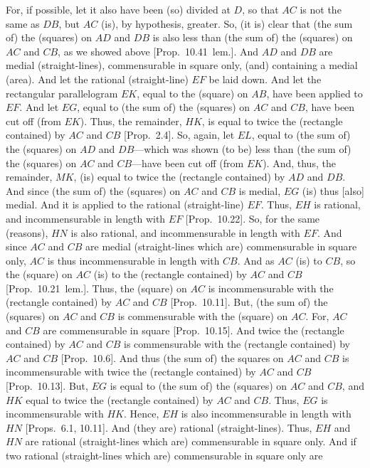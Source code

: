 For, if possible, let it also have  been (so) divided at $D$, so that $AC$ is not the
same as $DB$, but $AC$ (is), by hypothesis, greater. So, (it is)  clear that
(the sum of) the (squares) on $AD$ and $DB$ is also less than (the sum of)
the (squares) on $AC$ and $CB$, as we showed above [Prop.~10.41~lem.].  And $AD$ and $DB$ are medial (straight-lines), commensurable in square only, (and)
containing a medial (area). And let the rational (straight-line) $EF$
be laid down. And let the rectangular parallelogram $EK$, equal to the (square) on $AB$, have been applied to $EF$. And let $EG$, equal to
(the sum of) the (squares) on $AC$ and $CB$, have been cut  off (from $EK$).
Thus, the remainder, $HK$, is equal to twice the (rectangle contained)
by $AC$ and $CB$ [Prop.~2.4]. So, again,
let $EL$, equal to  (the sum of) the (squares) on  $AD$ and $DB$---which was shown (to be) less than (the sum of) the (squares) on $AC$ and
$CB$---have been cut off (from $EK$). And, thus, the remainder, $MK$,
(is) equal to twice the (rectangle contained) by $AD$ and $DB$. 
And since (the sum of) the (squares) on $AC$ and $CB$ is medial, $EG$ (is) thus [also]
medial. And it is applied to the rational (straight-line) $EF$. Thus, $EH$
is rational, and incommensurable in length with $EF$ [Prop.~10.22]. So, for the same (reasons), $HN$
is also rational, and incommensurable in length with $EF$. And since 
$AC$ and $CB$  are medial (straight-lines which are) commensurable
in square only, $AC$ is thus incommensurable in length with $CB$.
And as $AC$ (is) to $CB$, so the (square) on $AC$ (is) to the
(rectangle contained) by $AC$ and $CB$ [Prop.~10.21~lem.]. Thus, the (square) on $AC$ is
incommensurable with the (rectangle contained) by $AC$ and $CB$
[Prop.~10.11]. But, (the sum of) the (squares)
on $AC$ and $CB$ is commensurable with the (square) on $AC$.
For, $AC$ and $CB$ are commensurable in square [Prop.~10.15]. And
twice the (rectangle contained) by $AC$ and $CB$ is commensurable with the (rectangle contained) by $AC$ and $CB$ [Prop.~10.6]. And thus
(the sum of) the squares on $AC$ and $CB$ is incommensurable with twice
the (rectangle contained) by $AC$ and $CB$ [Prop.~10.13]. But, $EG$ is equal to (the sum
of) the (squares) on $AC$ and $CB$, and $HK$ equal to twice the (rectangle
contained) by $AC$ and $CB$. Thus, $EG$ is incommensurable
with $HK$. Hence, $EH$ is also incommensurable in length with  $HN$
[Props.~6.1, 10.11].
And (they are)  rational (straight-lines). Thus, $EH$ and $HN$ are rational
(straight-lines which are) commensurable in square only. And if two
rational (straight-lines which are) commensurable in square only are
